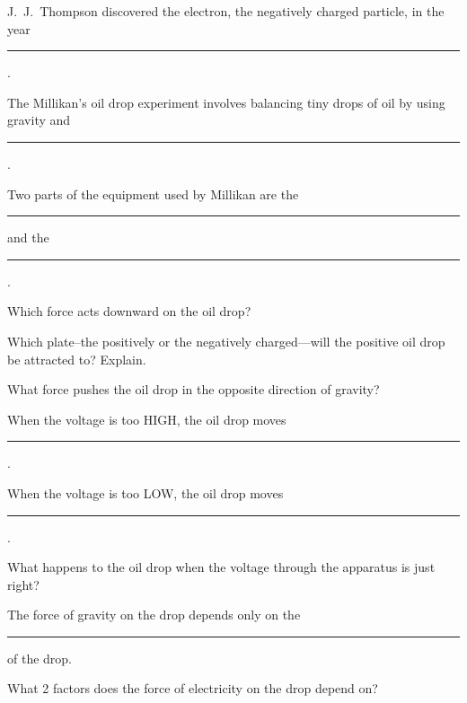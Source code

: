 \documentclass[dvipsnames]{article}
\numberwithin{equation}{section}
\numberwithin{figure}{section}
\begin{document}
\begin{exercise}
    J.~J.~Thompson discovered the electron, the negatively charged particle, in the year \rule{2cm}{0.15mm}.
\end{exercise}

\begin{exercise}
    The Millikan's oil drop experiment involves balancing tiny drops of oil by using gravity and \rule{2cm}{0.15mm}.
\end{exercise}


\begin{exercise}
    Two parts of the equipment used by Millikan are the \rule{2cm}{0.15mm} and the \rule{2cm}{0.15mm}.
\end{exercise}

\begin{exercise}
    Which force acts downward on the oil drop?
\end{exercise}

\begin{exercise}
    Which plate--the positively or the negatively charged---will the positive oil drop be attracted to? Explain.
\end{exercise}

\begin{exercise}
    What force pushes the oil drop in the opposite direction of gravity?
\end{exercise}

\begin{exercise}
    When the voltage is too HIGH, the oil drop moves \rule{2cm}{0.15mm}.
\end{exercise}

\begin{exercise}
    When the voltage is too LOW, the oil drop moves \rule{2cm}{0.15mm}.
\end{exercise}

\begin{exercise}
    What happens to the oil drop when the voltage through the apparatus is just right?
\end{exercise}

\begin{exercise}
    The force of gravity on the drop depends only on the \rule{2cm}{0.15mm} of the drop.
\end{exercise}

\begin{exercise}
    What 2 factors does the force of electricity on the drop depend on?
\end{exercise}
\end{document}
